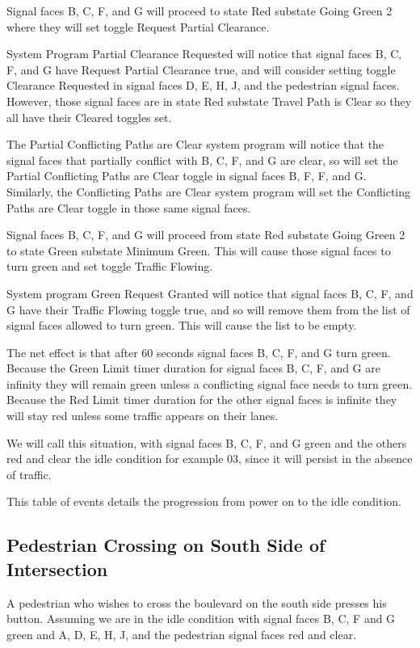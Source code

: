 \documentclass[letterpaper,twoside]{article}
\begin{document}
Signal faces B, C, F, and G will proceed to state Red
substate Going Green 2 where they will set toggle Request Partial Clearance.

System Program Partial Clearance Requested will notice that signal faces
B, C, F, and G have Request Partial Clearance true,
and will consider setting toggle Clearance
Requested in signal faces D, E, H, J, and the pedestrian signal faces.
However, those signal faces
are in state Red substate Travel Path is Clear so they all have their
Cleared toggles set.

The Partial Conflicting Paths are Clear system program will notice that the
signal faces that partially conflict with B, C, F, and G are clear,
so will set the
Partial Conflicting Paths are Clear toggle in signal faces B, F, F, and G.
Similarly, the Conflicting Paths are Clear system program will set
the Conflicting Paths are Clear toggle in those same signal faces.

Signal faces B, C, F, and G will proceed from state Red substate
Going Green 2 to state Green substate Minimum Green.
This will cause those signal faces to turn green and set toggle
Traffic Flowing.

System program Green Request Granted will notice that signal faces
B, C, F, and G have their Traffic Flowing toggle true,
and so will remove them from the list of signal faces allowed to turn green.
This will cause the list to be empty.

The net effect is that after 60 seconds signal faces
B, C, F, and G turn green.  Because the Green Limit timer duration for signal
faces B, C, F, and G are infinity they will remain green unless
a conflicting signal face needs to turn green.  Because the Red Limit
timer duration for the other signal faces is infinite they will stay red
unless some traffic appears on their lanes.

We will call this situation, with signal faces B, C, F, and G green
and the others red and clear the idle condition for example 03,
since it will persist in the absence of traffic.

This table of events details the progression from power on to the idle
condition.



\subsection{Pedestrian Crossing on South Side of Intersection}
A pedestrian who wishes to cross the boulevard on the south side
presses his button.  Assuming we are in the idle condition
with signal faces
B, C, F and G green and A, D, E, H, J, and the pedestrian signal faces
red and clear.
\end{document}
